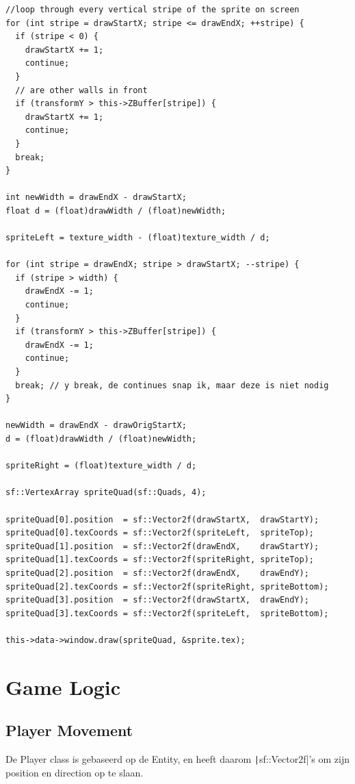 \documentclass{report}
\begin{document}
\begin{verbatim}
//loop through every vertical stripe of the sprite on screen
for (int stripe = drawStartX; stripe <= drawEndX; ++stripe) {
  if (stripe < 0) {
    drawStartX += 1;
    continue;
  }
  // are other walls in front
  if (transformY > this->ZBuffer[stripe]) {
    drawStartX += 1;
    continue;
  }
  break;
}

int newWidth = drawEndX - drawStartX;
float d = (float)drawWidth / (float)newWidth;

spriteLeft = texture_width - (float)texture_width / d;

for (int stripe = drawEndX; stripe > drawStartX; --stripe) {
  if (stripe > width) {
    drawEndX -= 1;
    continue;
  }
  if (transformY > this->ZBuffer[stripe]) {
    drawEndX -= 1;
    continue;
  }
  break; // y break, de continues snap ik, maar deze is niet nodig
}

newWidth = drawEndX - drawOrigStartX;
d = (float)drawWidth / (float)newWidth;

spriteRight = (float)texture_width / d;

sf::VertexArray spriteQuad(sf::Quads, 4);

spriteQuad[0].position  = sf::Vector2f(drawStartX,  drawStartY);
spriteQuad[0].texCoords = sf::Vector2f(spriteLeft,  spriteTop);
spriteQuad[1].position  = sf::Vector2f(drawEndX,    drawStartY);
spriteQuad[1].texCoords = sf::Vector2f(spriteRight, spriteTop);
spriteQuad[2].position  = sf::Vector2f(drawEndX,    drawEndY);
spriteQuad[2].texCoords = sf::Vector2f(spriteRight, spriteBottom);
spriteQuad[3].position  = sf::Vector2f(drawStartX,  drawEndY);
spriteQuad[3].texCoords = sf::Vector2f(spriteLeft,  spriteBottom);

this->data->window.draw(spriteQuad, &sprite.tex);
\end{verbatim}

  \section{Game Logic} %
  \label{sec:game_logic}

    \subsection{Player Movement} %
    \label{sub:player_movement}
    De Player class is gebaseerd op de Entity, en heeft daarom \texttt|sf::Vector2f|’s om zijn position en direction op te slaan.
\end{document}

